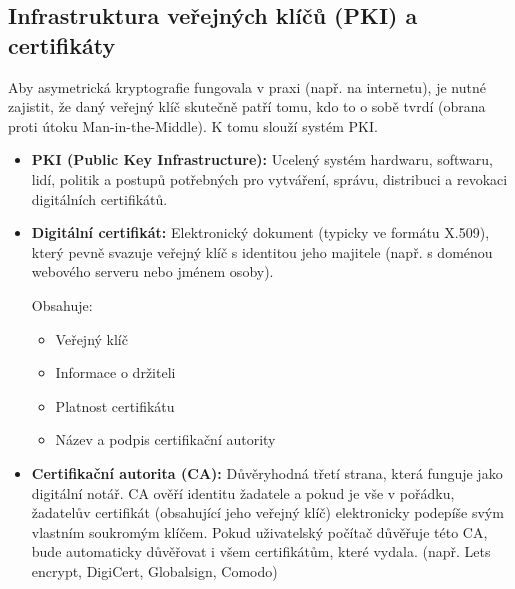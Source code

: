\subsection{Infrastruktura veřejných klíčů (PKI) a certifikáty}
Aby asymetrická kryptografie fungovala v praxi (např. na internetu), je nutné zajistit, že daný veřejný klíč skutečně patří tomu, kdo to o sobě tvrdí (obrana proti útoku Man-in-the-Middle). K tomu slouží systém PKI.
\begin{itemize}
    \item \textbf{PKI (Public Key Infrastructure):} Ucelený systém hardwaru, softwaru, lidí, politik a postupů potřebných pro vytváření, správu, distribuci a revokaci digitálních certifikátů.
    \item \textbf{Digitální certifikát:} Elektronický dokument (typicky ve formátu X.509), který pevně svazuje veřejný klíč s identitou jeho majitele (např. s doménou webového serveru nebo jménem osoby).
    
    Obsahuje:
    \begin{itemize}
        \item Veřejný klíč
        \item Informace o držiteli
        \item Platnost certifikátu
        \item Název a podpis certifikační autority
    \end{itemize}
    \item \textbf{Certifikační autorita (CA):} Důvěryhodná třetí strana, která funguje jako digitální notář. CA ověří identitu žadatele a pokud je vše v pořádku, žadatelův certifikát (obsahující jeho veřejný klíč) elektronicky podepíše svým vlastním soukromým klíčem. Pokud uživatelský počítač důvěřuje této CA, bude automaticky důvěřovat i všem certifikátům, které vydala. (např. Lets encrypt, DigiCert, Globalsign, Comodo)
\end{itemize}